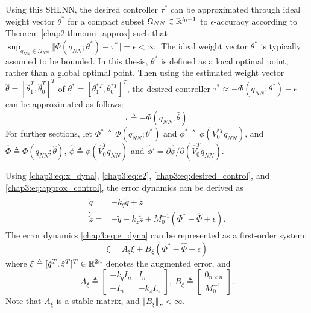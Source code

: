 Using this SHLNN, the desired controller $\tau^*$ can be approximated through ideal weight vector $\theta^*$ for a compact subset $\Omega_{NN}\in\mathbb{R}^{l_0+1}$ to $\epsilon$-accuracy according to Theorem \ref{chap2:thm:uni_approx} such that $\sup_{{q_{NN}}\in\Omega_{NN}} \Vert\Phi({q_{NN}};\theta^*) - \tau^*\Vert=\epsilon<\infty$.
The ideal weight vector $\theta^*$ is typically assumed to be bounded.
In this thesis, $\theta^*$ is defined as a local optimal point, rather than a global optimal point.
Then using the estimated weight vector $\hat\theta=[\hat\theta_1^T,\hat\theta_0^T]^T$ of $\theta^*=[\theta_1^{*T},\theta_0^{*T}]^T$, the desired controller $\tau^*\approx -\Phi(q_{NN};\theta^*)-\epsilon$ can be approximated as follows:
\begin{equation}
    \tau \triangleq -\Phi({q_{NN}};\hat\theta).
    \label{chap3:eq:approx_control}
\end{equation}
For further sections, let $\Phi^*\triangleq\Phi({q_{NN}};\theta^*)$ and $\phi^* \triangleq\phi(V_0^{*T}{q_{NN}})$, and $\hat\Phi\triangleq\Phi({q_{NN}};\hat\theta)$, $\hat\phi \triangleq\phi(\hat V_0^{T}{q_{NN}})$ and $\hat\phi' = \partial \hat\phi/\partial (\hat V_0^Tq_{NN})$.

Using \eqref{chap3:eq:x_dyna}, \eqref{chap3:eq:e2}, \eqref{chap3:eq:desired_control}, and \eqref{chap3:eq:approx_control}, the error dynamics can be derived as
\begin{equation}
    \begin{aligned}
        \dot {\tilde q} = & -{k_q} {\tilde q} + {\tilde z} \\
        \dot {\tilde z} = & -{\tilde q} -{k_z} {\tilde z} + M_0^{-1} (\Phi^*-\hat\Phi+\epsilon).
    \end{aligned}
    \label{chap3:eq:e_dyna}
\end{equation}
The error dynamics \eqref{chap3:eq:e_dyna} can be represented as a first-order system: 
\begin{equation}
    \dot\xi = A_\xi \xi + B_\xi (\Phi^*-\hat\Phi+\epsilon)
    \label{chap3:eq:xi_dyna}
\end{equation}
where 
$\xi\triangleq[{\tilde q}^T  , {\tilde z}^T  ]^T  \in\mathbb{R}^{2n}$ denotes the augmented error,
and
\begin{equation}
    A_\xi \triangleq 
    \begin{bmatrix}
        -{k_q} I_n &I_n\\-I_n& -{k_z} I_n
    \end{bmatrix}
    ,\ 
    B_\xi \triangleq 
    \begin{bmatrix}
        0_{n\times n}\\M_0^{-1}
    \end{bmatrix}.
\end{equation}
Note that $A_\xi$ is a stable matrix, and $\Vert B_\xi\Vert_F<\infty$.

